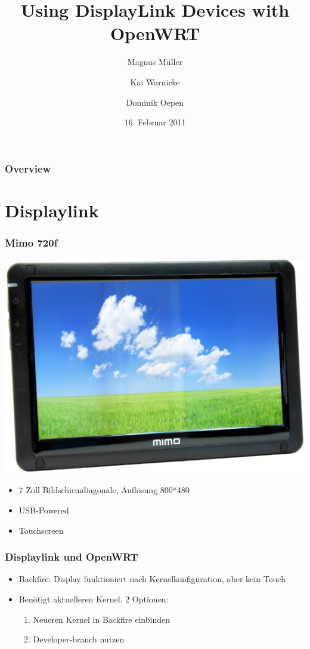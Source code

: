 \documentclass{beamer}
\title{Using DisplayLink Devices with OpenWRT}
\institute[{Humboldt-Universität zu Berlin}]{\inst{}Humboldt-Universität zu Berlin}
\author[Magnus Müller \and Kai Warnicke \and Dominik Oepen]{Magnus Müller \and Kai Warnicke \and Dominik Oepen}
\date[16.02.2011]{16. Februar 2011}
\begin{document}
	\begin{frame}
		\titlepage
	\end{frame}

	\begin{frame}
		\frametitle{Overview}
		\tableofcontents
	\end{frame}	

	\section{Displaylink}
	
	\begin{frame}
		\frametitle{Mimo 720f}
		\begin{center}
			\includegraphics[scale=0.3]{img/mimo720f}
		\end{center}
		
		\begin{itemize}
			\item 7 Zoll Bildschirmdiagonale, Auflösung 800*480
			\item USB-Powered
			\item Touchscreen
		\end{itemize}
	\end{frame}
			
	\begin{frame}
		\frametitle{Displaylink und OpenWRT}
		\begin{itemize}
			\item Backfire: Display funktioniert nach Kernelkonfiguration, aber kein Touch
			\item Benötigt aktuelleren Kernel. 2 Optionen:
				\begin{enumerate}
					\item Neueren Kernel in Backfire einbinden
					\item Developer-branch nutzen
				\end{enumerate}
		\end{itemize}
	\end{frame}
\end{document}
